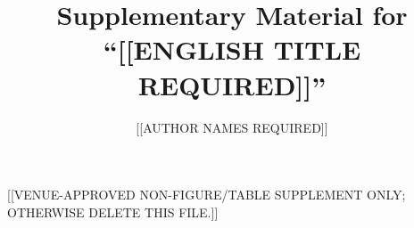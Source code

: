 \documentclass[12pt]{article}
\title{Supplementary Material for ``[[ENGLISH TITLE REQUIRED]]''}
\author{[[AUTHOR NAMES REQUIRED]]}
\date{}
\begin{document}
\linenumbers
\maketitle


[[VENUE-APPROVED NON-FIGURE/TABLE SUPPLEMENT ONLY; OTHERWISE DELETE THIS FILE.]]



\end{document}
